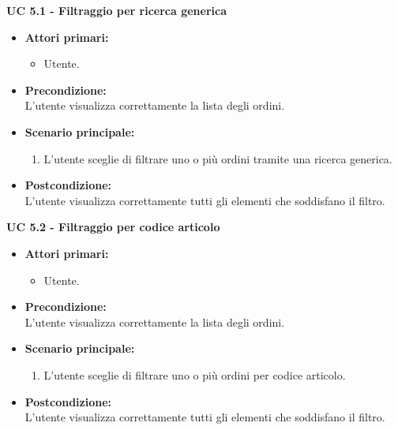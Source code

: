 \vspace{0.4cm}

\noindent \textbf{\large UC 5.1 - Filtraggio per ricerca generica}
\label{uc:filtraggio-ricerca-generica}
\begin{itemize}

	\item \textbf{Attori primari: }
		\begin{itemize}
			\item Utente.
		\end{itemize}

	\item \textbf{Precondizione: }\\[0.3cm]
		L'utente visualizza correttamente la lista degli ordini.

	\item \textbf{Scenario principale: }
		\begin{enumerate}
			\item L'utente sceglie di filtrare uno o più ordini tramite una ricerca generica.
		\end{enumerate}
		

	\item \textbf{Postcondizione: }\\[0.3cm]
		L'utente visualizza correttamente tutti gli elementi che soddisfano il filtro.

\end{itemize}

\vspace{0.4cm}

\noindent \textbf{\large UC 5.2 - Filtraggio per codice articolo}
\label{uc:filtraggio-codice-articolo}
\begin{itemize}

	\item \textbf{Attori primari: }
		\begin{itemize}
			\item Utente.
		\end{itemize}

	\item \textbf{Precondizione: }\\[0.3cm]
		L'utente visualizza correttamente la lista degli ordini.

	\item \textbf{Scenario principale: }
		\begin{enumerate}
			\item L'utente sceglie di filtrare uno o più ordini per codice articolo.
		\end{enumerate}
		

	\item \textbf{Postcondizione: }\\[0.3cm]
		L'utente visualizza correttamente tutti gli elementi che soddisfano il filtro.

\end{itemize}

